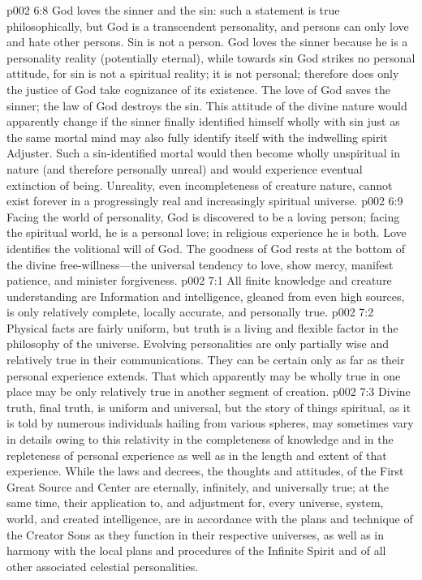 \pc \vs p002 6:8 God loves the sinner and  the sin: such a statement is true philosophically, but God is a transcendent personality, and persons can only love and hate other persons. Sin is not a person. God loves the sinner because he is a personality reality (potentially eternal), while towards sin God strikes no personal attitude, for sin is not a spiritual reality; it is not personal; therefore does only the justice of God take cognizance of its existence. The love of God saves the sinner; the law of God destroys the sin. This attitude of the divine nature would apparently change if the sinner finally identified himself wholly with sin just as the same mortal mind may also fully identify itself with the indwelling spirit Adjuster. Such a sin\hyp{}identified mortal would then become wholly unspiritual in nature (and therefore personally unreal) and would experience eventual extinction of being. Unreality, even incompleteness of creature nature, cannot exist forever in a progressingly real and increasingly spiritual universe.
\pc \vs p002 6:9 Facing the world of personality, God is discovered to be a loving person; facing the spiritual world, he is a personal love; in religious experience he is both. Love identifies the volitional will of God. The goodness of God rests at the bottom of the divine free\hyp{}willness---the universal tendency to love, show mercy, manifest patience, and minister forgiveness.\plusone
{}
\vs p002 7:1 All finite knowledge and creature understanding are  Information and intelligence, gleaned from even high sources, is only relatively complete, locally accurate, and personally true.
\vs p002 7:2 Physical facts are fairly uniform, but truth is a living and flexible factor in the philosophy of the universe. Evolving personalities are only partially wise and relatively true in their communications. They can be certain only as far as their personal experience extends. That which apparently may be wholly true in one place may be only relatively true in another segment of creation.
\vs p002 7:3 Divine truth, final truth, is uniform and universal, but the story of things spiritual, as it is told by numerous individuals hailing from various spheres, may sometimes vary in details owing to this relativity in the completeness of knowledge and in the repleteness of personal experience as well as in the length and extent of that experience. While the laws and decrees, the thoughts and attitudes, of the First Great Source and Center are eternally, infinitely, and universally true; at the same time, their application to, and adjustment for, every universe, system, world, and created intelligence, are in accordance with the plans and technique of the Creator Sons as they function in their respective universes, as well as in harmony with the local plans and procedures of the Infinite Spirit and of all other associated celestial personalities.
